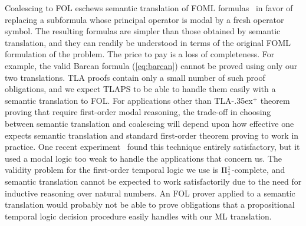\documentclass{easychair}
\newcommand{\tlaplus}{\mbox{TLA\kern -.35ex$^+$}\xspace}
\newcommand{\edmargin}[2]{\marginpar{\raggedright\footnotesize\color{red}#1: #2}}
\newcommand{\edmargin}[2]{}
\def\llmargin{\edmargin{LL}}
\def\smmargin{\edmargin{SM}}
\let\notla\relax
\def\A{\forall\,}
\begin{document}
Coalescing to FOL eschews semantic translation of FOML
formulas~\cite{ohlbach:translation} in favor of replacing a subformula whose
principal operator is modal by a fresh operator symbol.
The resulting formulas
are simpler than those obtained by semantic translation, and they can readily be
understood in terms of the original FOML formulation of the problem.
The
price to pay is a loss of completeness. For example, the valid Barcan
formula (\ref{eq:barcan})
cannot be proved using only our two translations.  TLA proofs contain
only a small number of such proof obligations, and we expect TLAPS to
be able to handle them easily with a semantic translation to FOL\@.
For applications other than \tlaplus theorem proving that require
first-order modal reasoning, the trade-off in choosing between semantic
translation and coalescing will depend upon how effective one expects
semantic translation and standard first-order theorem proving to work
in practice.  One recent experiment~\cite{benzmueller:god} found this
technique entirely satisfactory, but it used a modal logic too weak to
handle the applications that concern us.  The
validity problem for the
first-order temporal
logic we use is $\notla\Pi^1_1$-complete, and semantic translation
cannot be expected to work satisfactorily due to the need for
inductive reasoning over natural numbers.  An FOL prover applied to a
semantic translation would probably not be able to prove obligations
that a propositional temporal logic decision procedure easily handles
with our ML translation.
\end{document}
